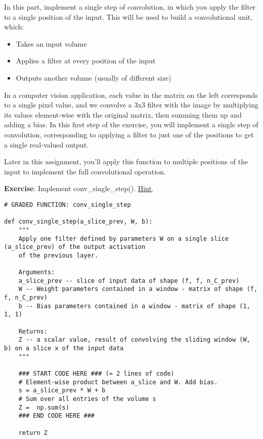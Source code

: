 {

In this part, implement a single step of convolution, in which you apply the filter to a single position of the input. This will be used to build a convolutional unit, which:
\begin{itemize}
\item Takes an input volume
\item Applies a filter at every position of the input
\item Outputs another volume (usually of different size)
\end{itemize}

In a computer vision application, each value in the matrix on the left corresponds to a single pixel value, and we convolve a 3x3 filter with the image by multiplying its values element-wise with the original matrix, then summing them up and adding a bias. In this first step of the exercise, you will implement a single step of convolution, corresponding to applying a filter to just one of the positions to get a single real-valued output.

Later in this assignment, you'll apply this function to multiple positions of the input to implement the full convolutional operation.

{\textbf {Exercise}}: Implement conv\_single\_step(). \href{https://docs.scipy.org/doc/numpy-1.13.0/reference/generated/numpy.sum.html}{Hint}.

\begin{verbatim}
# GRADED FUNCTION: conv_single_step

def conv_single_step(a_slice_prev, W, b):
    """
    Apply one filter defined by parameters W on a single slice (a_slice_prev) of the output activation 
    of the previous layer.
    
    Arguments:
    a_slice_prev -- slice of input data of shape (f, f, n_C_prev)
    W -- Weight parameters contained in a window - matrix of shape (f, f, n_C_prev)
    b -- Bias parameters contained in a window - matrix of shape (1, 1, 1)
    
    Returns:
    Z -- a scalar value, result of convolving the sliding window (W, b) on a slice x of the input data
    """

    ### START CODE HERE ### (≈ 2 lines of code)
    # Element-wise product between a_slice and W. Add bias.
    s = a_slice_prev * W + b
    # Sum over all entries of the volume s
    Z =  np.sum(s)
    ### END CODE HERE ###

    return Z
\end{verbatim}


}
